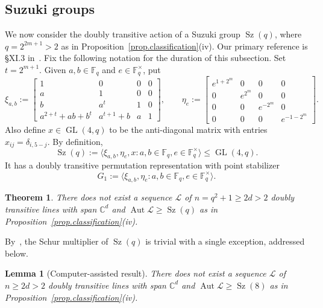 \documentclass[11pt]{article}
\newtheorem{theorem}[theo]{Theorem}
\newtheorem{lemma}[theo]{Lemma}
\theoremstyle{definition}
\numberwithin{equation}{section}
\begin{document}
\subsection{Suzuki groups}
We now consider the doubly transitive action of a Suzuki group $\operatorname{Sz}(q)$, where $q = 2^{2m+1} > 2$ as in Proposition~\ref{prop.classification}(iv).
Our primary reference is \S XI.3 in~\cite{HuppertB:82:III}.
Fix the following notation for the duration of this subsection.
Set $t = 2^{m+1}$.
Given $a,b \in \mathbb{F}_q$ and $e \in \mathbb{F}_q^\times$, put
\[
\xi_{a,b}
:=
\begin{bmatrix}
1 & 0 & 0 & 0 \\
a & 1 & 0 & 0 \\
b & a^t & 1 & 0 \\
a^{2+t} + ab + b^t & a^{t + 1} + b & a & 1
\end{bmatrix},
\qquad
\eta_e
:=
\begin{bmatrix}
e^{1+2^m} & 0 & 0 & 0 \\
0 & e^{2^m} & 0 & 0 \\
0 & 0 & e^{-2^m} & 0 \\
0 & 0 & 0 & e^{-1-2^m}
\end{bmatrix}.
\]
Also define $x \in \operatorname{GL}(4,q)$ to be the anti-diagonal matrix with entries $x_{ij} = \delta_{i,5-j}$.
By definition,
\[ \operatorname{Sz}(q) := \langle \xi_{a,b}, \eta_e, x : a,b \in \mathbb{F}_q, e \in \mathbb{F}_q^\times \rangle \leq \operatorname{GL}(4,q). \]
It has a doubly transitive permutation representation with point stabilizer
\[ G_1 := \langle \xi_{a,b}, \eta_e : a,b \in \mathbb{F}_q, e \in \mathbb{F}_q^\times \rangle. \]


\begin{theorem}
\label{thm.Suzuki groups}
There does not exist a sequence $\mathscr{L}$ of $n = q^2+1 \geq 2d > 2$ doubly transitive lines with span $\mathbb{C}^d$ and $\operatorname{Aut} \mathscr{L} \geq \operatorname{Sz}(q)$ as in Proposition~\ref{prop.classification}(iv).
\end{theorem}

By~\cite{AlperinGorenstein:66}, the Schur multiplier of $\operatorname{Sz}(q)$ is trivial with a single exception, addressed below.

\begin{lemma}[Computer-assisted result]
\label{lem.Sz8}
There does not exist a sequence $\mathscr{L}$ of $n \geq 2d > 2$ doubly transitive lines with span $\mathbb{C}^d$ and $\operatorname{Aut} \mathscr{L} \geq \operatorname{Sz}(8)$ as in Proposition~\ref{prop.classification}(iv).
\end{lemma}
\end{document}
